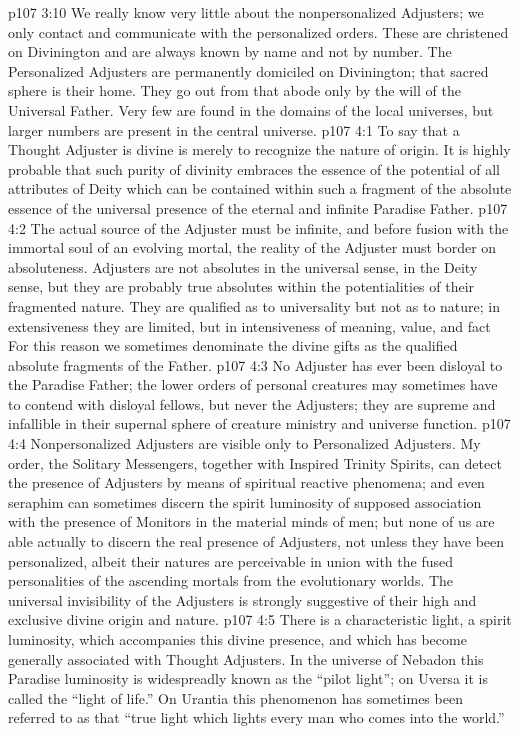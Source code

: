 \vs p107 3:10 We really know very little about the nonpersonalized Adjusters; we only contact and communicate with the personalized orders. These are christened on Divinington and are always known by name and not by number. The Personalized Adjusters are permanently domiciled on Divinington; that sacred sphere is their home. They go out from that abode only by the will of the Universal Father. Very few are found in the domains of the local universes, but larger numbers are present in the central universe.
\vs p107 4:1 To say that a Thought Adjuster is divine is merely to recognize the nature of origin. It is highly probable that such purity of divinity embraces the essence of the potential of all attributes of Deity which can be contained within such a fragment of the absolute essence of the universal presence of the eternal and infinite Paradise Father.
\vs p107 4:2 The actual source of the Adjuster must be infinite, and before fusion with the immortal soul of an evolving mortal, the reality of the Adjuster must border on absoluteness. Adjusters are not absolutes in the universal sense, in the Deity sense, but they are probably true absolutes within the potentialities of their fragmented nature. They are qualified as to universality but not as to nature; in extensiveness they are limited, but in intensiveness of meaning, value, and fact  For this reason we sometimes denominate the divine gifts as the qualified absolute fragments of the Father.
\vs p107 4:3 No Adjuster has ever been disloyal to the Paradise Father; the lower orders of personal creatures may sometimes have to contend with disloyal fellows, but never the Adjusters; they are supreme and infallible in their supernal sphere of creature ministry and universe function.
\pc \vs p107 4:4 Nonpersonalized Adjusters are visible only to Personalized Adjusters. My order, the Solitary Messengers, together with Inspired Trinity Spirits, can detect the presence of Adjusters by means of spiritual reactive phenomena; and even seraphim can sometimes discern the spirit luminosity of supposed association with the presence of Monitors in the material minds of men; but none of us are able actually to discern the real presence of Adjusters, not unless they have been personalized, albeit their natures are perceivable in union with the fused personalities of the ascending mortals from the evolutionary worlds. The universal invisibility of the Adjusters is strongly suggestive of their high and exclusive divine origin and nature.
\vs p107 4:5 There is a characteristic light, a spirit luminosity, which accompanies this divine presence, and which has become generally associated with Thought Adjusters. In the universe of Nebadon this Paradise luminosity is widespreadly known as the “pilot light”; on Uversa it is called the “light of life.” On Urantia this phenomenon has sometimes been referred to as that “true light which lights every man who comes into the world.”
